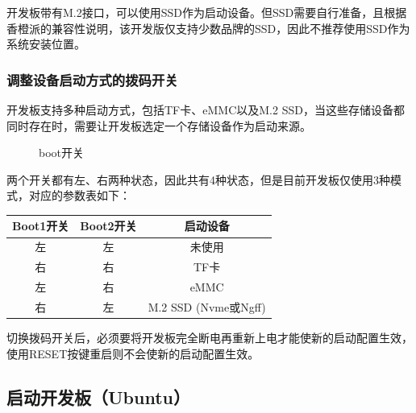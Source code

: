 开发板带有M.2接口，可以使用SSD作为启动设备。但SSD需要自行准备，且根据香橙派的兼容性说明，该开发版仅支持少数品牌的SSD，因此不推荐使用SSD作为系统安装位置。

\subsubsection{调整设备启动方式的拨码开关}\label{ux8c03ux6574ux8bbeux5907ux542fux52a8ux65b9ux5f0fux7684ux62e8ux7801ux5f00ux5173}

开发板支持多种启动方式，包括TF卡、eMMC以及M.2
SSD，当这些存储设备都同时存在时，需要让开发板选定一个存储设备作为启动来源。

\begin{figure}
\centering
{}
\caption{boot开关}
\end{figure}

两个开关都有左、右两种状态，因此共有4种状态，但是目前开发板仅使用3种模式，对应的参数表如下：

\begin{longtable}[]{@{}ccc@{}}
\toprule\noalign{}
Boot1开关 & Boot2开关 & 启动设备 \\
\midrule\noalign{}
\endhead
\bottomrule\noalign{}
\endlastfoot
左 & 左 & 未使用 \\
右 & 右 & TF卡 \\
左 & 右 & eMMC \\
右 & 左 & M.2 SSD (Nvme或Ngff) \\
\end{longtable}

切换拨码开关后，必须要将开发板完全断电再重新上电才能使新的启动配置生效，使用RESET按键重启则不会使新的启动配置生效。

\subsection{启动开发板（Ubuntu）}\label{ux542fux52a8ux5f00ux53d1ux677fubuntu}

